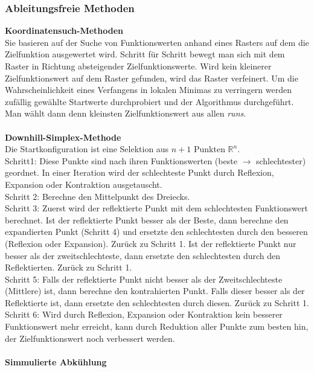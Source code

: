 		\subsubsection{Ableitungsfreie Methoden}
			\textbf{Koordinatensuch-Methoden}\\
			Sie basieren auf der Suche von Funktionswerten anhand eines Rasters auf dem die Zielfunktion ausgewertet wird. Schritt für Schritt bewegt man sich mit dem Raster in Richtung absteigender Zielfunktionswerte. Wird kein kleinerer Zielfunktionswert auf dem Raster gefunden, wird das Raster verfeinert. Um die Wahrscheinlichkeit eines Verfangens in lokalen Minimas zu verringern werden zufällig gewählte Startwerte durchprobiert und der Algorithmus durchgeführt. Man wählt dann denn kleinsten Zielfunktionswert aus allen \textit{runs}.
			\leavevmode\\\\
			\textbf{Downhill-Simplex-Methode}\\
			Die Startkonfiguration ist eine Selektion aus $ n+1 $ Punkten $ \mathbb{R}^{n} $. \\
			Schritt1: Diese Punkte sind nach ihren Funktionswerten (beste $ \rightarrow $ schlechtester) geordnet. In einer Iteration wird der schlechteste Punkt durch Reflexion, Expansion oder Kontraktion ausgetauscht.\\
			Schritt 2: Berechne den Mittelpunkt des Dreiecks.\\
			Schritt 3: Zuerst wird der reflektierte Punkt mit dem schlechtesten Funktionswert berechnet. Ist der reflektierte Punkt besser als der Beste, dann berechne den expandierten Punkt (Schritt 4) und ersetzte den schlechtesten durch den besseren (Reflexion oder Expansion). Zurück zu Schritt 1. Ist der reflektierte Punkt nur besser als der zweitschlechteste, dann ersetzte den schlechtesten durch den Reflektierten. Zurück zu Schritt 1.\\
			Schritt 5: Falls der reflektierte Punkt nicht besser als der Zweitschlechteste (Mittlere) ist, dann berechne den kontrahierten Punkt. Falls dieser besser als der Reflektierte ist, dann ersetzte den schlechtesten durch diesen. Zurück zu Schritt 1.\\
			Schritt 6: Wird durch Reflexion, Expansion oder Kontraktion kein besserer Funktionswert mehr erreicht, kann durch Reduktion aller Punkte zum besten hin, der Zielfunktionswert noch verbessert werden.
			\leavevmode\\\\
			\textbf{Simmulierte Abkühlung}\\
